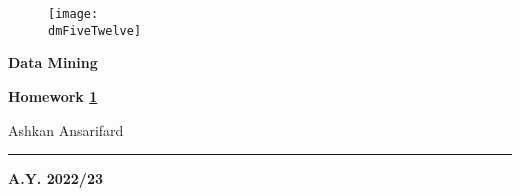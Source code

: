 \geometry{
	a4paper, %
	left=2cm, %
	right=2cm, %
	top=2.5cm, %
	bottom=2.5cm %
}




	
	\begin{center}
		\begin{figure}[h]
			\centering
			\texttt{[image: \\dmFiveTwelve]}
		\end{figure}
		\vspace{1cm} 
		{\fontsize{28}{34}\selectfont \textbf{Data Mining}}
	\end{center}

	\vspace{1cm} 
	
	\begin{center}
	{\fontsize{22}{28}\selectfont \textbf{Homework \underline{1}}}
	\end{center}

	\vspace{1cm} 

	\begin{center}
	{\fontsize{22}{28}\selectfont Ashkan Ansarifard}
	\end{center}

	\vspace{0.5cm} 
	
	\begin{center}
	{\fontsize{22}{28}}
	\end{center}

	\vspace{1cm} 
	
	\textcolor{blue!60!black}{\rule{\linewidth}{2pt}}
	
	\vspace{5cm} 
	
	\begin{center}
	\textbf{A.Y. 2022/23}
	\end{center}

	\thispagestyle{empty}
	
	\newpage
	
	\myTOC

